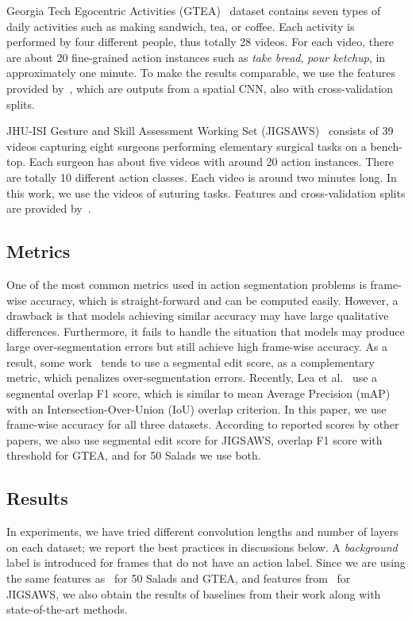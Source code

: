 \documentclass{article}
\begin{document}
Georgia Tech Egocentric Activities (GTEA)~\cite{gtea} dataset contains seven types of daily activities such as making sandwich, tea, or coffee. Each activity is performed by four different people, thus totally 28 videos. For each video, there are about 20 fine-grained action instances such as \textit{take bread}, \textit{pour ketchup}, in approximately one minute. To make the results comparable, we use the features provided by~\cite{LeFlViCVPR2017}, which are outputs from a spatial CNN, also with cross-validation splits.

JHU-ISI Gesture and Skill Assessment Working Set (JIGSAWS)~\cite{jigsaws} consists of 39 videos capturing eight surgeons performing elementary surgical tasks on a bench-top. Each surgeon has about five videos with around 20 action instances. There are totally 10 different action classes. Each video is around two minutes long. In this work, we use the videos of suturing tasks. Features and cross-validation splits are provided by~\cite{tcnw}.


\subsection{Metrics}

One of the most common metrics used in action segmentation problems is frame-wise accuracy, which is straight-forward and can be computed easily. However, a drawback  is that models achieving similar accuracy may have large qualitative differences. Furthermore, it fails to handle the situation that models may produce large over-segmentation errors but still achieve high frame-wise accuracy. As a result, some work~\cite{scnn,lea} tends to use a segmental edit score, as a complementary metric, which penalizes over-segmentation errors. Recently, Lea et al.~\cite{LeFlViCVPR2017} use a segmental overlap F1 score, which is similar to mean Average Precision (mAP) with an Intersection-Over-Union (IoU) overlap criterion. In this paper, we use frame-wise accuracy for all three datasets. According to reported scores by other papers, we also use segmental edit score for JIGSAWS, overlap F1 score with threshold  for GTEA, and for 50 Salads we use both. 

\subsection{Results}

In experiments, we have tried different convolution lengths and number of layers on each dataset; we report the best practices in discussions below. A \textit{background} label is introduced for frames that do not have an action label. Since we are using the same features as~\cite{LeFlViCVPR2017} for 50 Salads and GTEA, and features from~\cite{tcnw} for JIGSAWS, we also obtain the results of baselines from their work along with state-of-the-art methods. 
\end{document}

